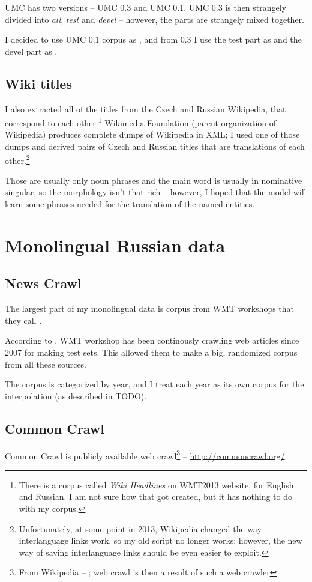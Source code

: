 UMC has two versions -- UMC 0.3 and UMC 0.1. UMC 0.3 is then strangely divided into \emph{all}, \emph{test} and \emph{devel} -- however, the parts are strangely mixed together.

I decided to use UMC 0.1 corpus as , and from 0.3 I use the test part as  and the devel part as .


\subsection{Wiki titles}
I also extracted all of the titles from the Czech and Russian Wikipedia, that correspond to each other.\footnote{There is a corpus called \emph{Wiki Headlines} on WMT2013 website, for English and Russian. I am not sure how that got created, but it has nothing to do with my corpus.} 
Wikimedia Foundation (parent organization of Wikipedia) produces complete dumps of Wikipedia in XML; I used one of those dumps and derived pairs of Czech and Russian titles that are translations of each other.\footnote{Unfortunately, at some point in 2013, Wikipedia changed the way interlanguage links work, so my old script no longer works; however, the new way of saving interlanguage links should be even easier to exploit.}

Those are usually only noun phrases and the main word is usually in nominative singular, so the morphology isn't that rich -- however, I hoped that the model will learn some phrases needed for the translation of the named entities.
\section{Monolingual Russian data}
\subsection{News Crawl}
The largest part of my monolingual data is corpus from WMT workshops that they call .

According to \cite{wmt_findings_2009}, WMT workshop has been continously crawling web articles since 2007 for making test sets. This allowed them to make a big, randomized corpus from all these sources.

The corpus is categorized by year, and I treat each year as its own corpus for the interpolation (as described in TODO).%
\subsection{Common Crawl}
Common Crawl is publicly available web crawl\footnote{From Wikipedia -- ; web crawl is then a result of such a web crawler} -- \url{http://commoncrawl.org/}.

